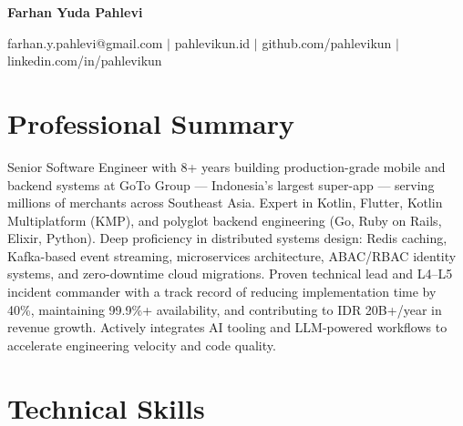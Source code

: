 \documentclass[10pt]{article}
\begin{document}
{\LARGE \textbf{Farhan Yuda Pahlevi}}

\smallskip
farhan.y.pahlevi@gmail.com $|$ pahlevikun.id $|$ github.com/pahlevikun $|$ linkedin.com/in/pahlevikun

\section*{Professional Summary}
Senior Software Engineer with 8+ years building production-grade mobile and backend systems at GoTo Group --- Indonesia's largest super-app --- serving millions of merchants across Southeast Asia. Expert in Kotlin, Flutter, Kotlin Multiplatform (KMP), and polyglot backend engineering (Go, Ruby on Rails, Elixir, Python). Deep proficiency in distributed systems design: Redis caching, Kafka-based event streaming, microservices architecture, ABAC/RBAC identity systems, and zero-downtime cloud migrations. Proven technical lead and L4--L5 incident commander with a track record of reducing implementation time by 40\%, maintaining 99.9\%+ availability, and contributing to IDR 20B+/year in revenue growth. Actively integrates AI tooling and LLM-powered workflows to accelerate engineering velocity and code quality.

\section*{Technical Skills}
\end{document}
